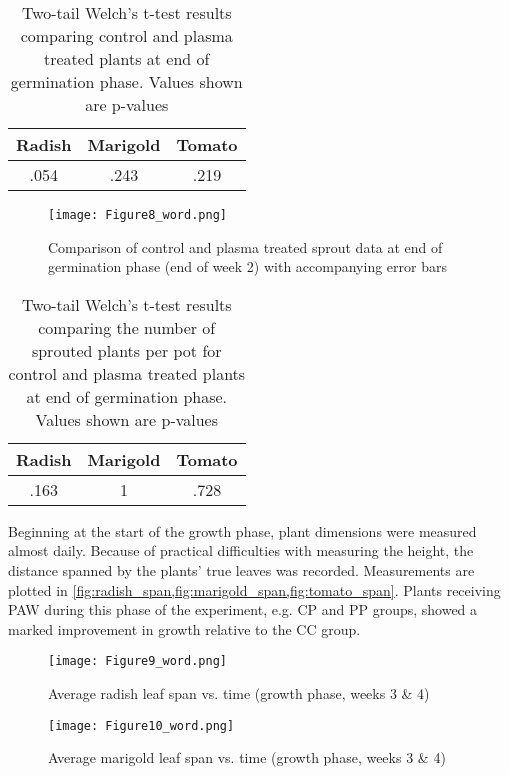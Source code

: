 \begin{table}[htpb]
  \begin{center}
    \begin{tabular}{c |c |c }
      Radish & Marigold & Tomato \\
      \hline
      .054 & .243 & .219
    \end{tabular}
  \end{center}
  \caption{Two-tail Welch's t-test results comparing control and plasma treated plants at end of germination phase.  Values shown are p-values}
  \label{tab:germ_heights_t}
\end{table}

\begin{figure}[htbp]
  \centering
  \texttt{[image: Figure8\_word.png]}
  \caption{Comparison of control and plasma treated sprout data at end of germination phase (end of week 2) with accompanying error bars}
  \label{fig:germ_sprouts}
\end{figure}

\begin{table}[htpb]
  \begin{center}
    \begin{tabular}{c |c |c }
      Radish & Marigold & Tomato \\
      \hline
      .163 & 1 & .728
    \end{tabular}
  \end{center}
  \caption{Two-tail Welch's t-test results comparing the number of sprouted plants per pot for control and plasma treated plants at end of germination phase.  Values shown are p-values}
  \label{tab:germ_sprouts_t}
\end{table}

Beginning at the start of the growth phase, plant dimensions were measured almost daily. Because of practical difficulties with measuring the height, the distance spanned by the plants' true leaves was recorded.  Measurements are plotted in \cref{fig:radish_span,fig:marigold_span,fig:tomato_span}. Plants receiving PAW during this phase of the experiment, e.g. CP and PP groups, showed a marked improvement in growth relative to the CC group.

\begin{figure}[htbp]
  \centering
  \texttt{[image: Figure9\_word.png]}
  \caption{Average radish leaf span vs. time (growth phase, weeks 3 \& 4)}
  \label{fig:radish_span}
\end{figure}

\begin{figure}[htbp]
  \centering
  \texttt{[image: Figure10\_word.png]}
  \caption{Average marigold leaf span vs. time (growth phase, weeks 3 \& 4)}
  \label{fig:marigold_span}
\end{figure}

